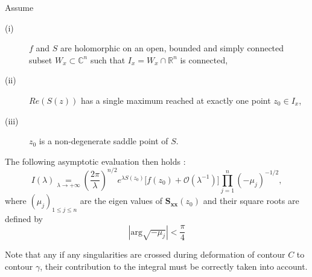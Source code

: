 \begin{prop}
Assume
\begin{description}
  \item[(i)] $f$ and $S$ are holomorphic on an open, bounded and simply connected subset $W_x \subset \mathbb{C}^n$ such that $I_x=W_x \cap \mathbb{R}^n$ is connected,
  \item[(ii)]$ Re\left( S(z) \right)$ has a single maximum reached at exactly one point $z_0 \in I_x$,
  \item[(iii)] $z_0$ is a non-degenerate saddle point of $S$.
\end{description}
The following asymptotic evaluation then holds :
\begin{equation}
I(\lambda) \underset{\lambda \to +\infty}{=} \left( \frac{2\pi}{\lambda} \right)^{n/2} e^{\lambda S(z_0)} \lbrack f(z_0)+ \mathcal{O}(\lambda^{-1}) \rbrack \prod_{j=1}^n (-\mu_j)^{-1/2},
\label{steepformula}
\end{equation}
where $(\mu_j)_{1\leq j \leq n}$ are the eigen values of $\mathbf{S_{xx}}(z_0)$ and their square roots are defined by
$$|\mbox{arg} \sqrt{-\mu_j}| <\frac{\pi}{4} $$
\end{prop}

Note that any if any singularities are crossed during deformation of contour $C$ to contour $\gamma$, their contribution to the integral must be correctly taken into account.